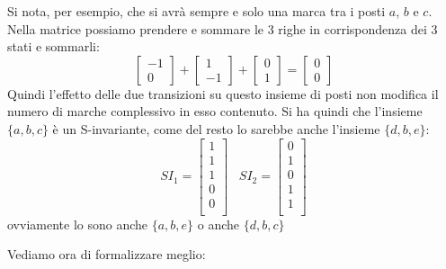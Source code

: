 \documentclass[a4paper,12pt, oneside]{book}
\begin{document}
\begin{definizione}
\begin{esempio}
    Si nota, per esempio, che si avrà sempre e solo una marca tra i posti
    $a$, $b$ e $c$. Nella matrice possiamo prendere e sommare le 3 righe in
    corrispondenza dei 3 stati e sommarli:
    \[
      \left[
        \begin{matrix}
          -1\\
          0
        \end{matrix}
      \right]+\left[
        \begin{matrix}
          1\\
          -1
        \end{matrix}
      \right]+\left[
        \begin{matrix}
          0\\
          1
        \end{matrix}
      \right]=\left[
        \begin{matrix}
          0\\
          0
        \end{matrix}
      \right]
    \]
    Quindi l'effetto delle due transizioni su questo insieme di posti non
    modifica il numero di marche complessivo in esso contenuto. Si ha quindi che
    l'insieme $\{a,b,c\}$ è un S-invariante, come del resto lo sarebbe anche
    l'insieme $\{d,b,e\}$:
    \[SI_1=\left[
        \begin{matrix}
          1\\
          1\\
          1\\
          0\\
          0\\
        \end{matrix}
      \right]\,\,\,\,\,SI_2=\left[
        \begin{matrix}
          0\\
          1\\
          0\\
          1\\
          1\\
        \end{matrix}
      \right]
    \]
    ovviamente lo sono anche $\{a,b,e\}$ o anche $\{d,b,c\}$
  \end{esempio}
\end{definizione}
Vediamo ora di formalizzare meglio:
\end{document}
